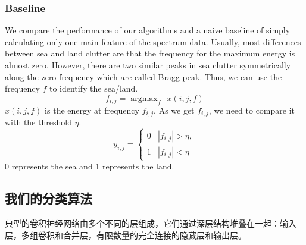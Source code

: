 \subsubsection{Baseline}
We compare the performance of our algorithms and a naive baseline of simply calculating only one main feature of the spectrum data. Usually, most differences between sea and land clutter are that the frequency for the maximum energy is almost zero. However, there are two similar peaks in sea clutter symmetrically along the zero frequency which are called Bragg peak. Thus, we can use the frequency $f$ to identify the sea/land.
\begin{equation}
f_{i, j}= \mathop{\arg\max}_{f} \ \ x(i, j, f)
\end{equation}
$x(i, j, f)$ is the energy at frequency $f_{i, j}$. As we get $f_{i, j}$, we need to compare it with the threshold $\eta$.
\[
y_{i, j}= \left\{\begin{array}{ll}
0&|f_{i, j}| > \eta, \\
1&|f_{i, j}| < \eta
\end{array}
\right.\]
0 represents the sea and 1 represents the land.
\subsection{我们的分类算法}

典型的卷积神经网络由多个不同的层组成，它们通过深层结构堆叠在一起：输入层，多组卷积和合并层，有限数量的完全连接的隐藏层和输出层。


